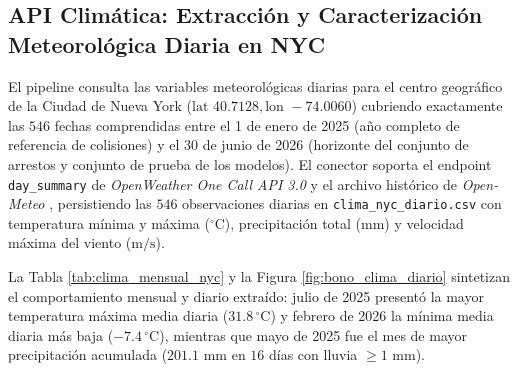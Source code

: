 \subsection{API Climática: Extracción y Caracterización Meteorológica Diaria en NYC}
\label{subsec:bono_api_clima}

El pipeline consulta las variables meteorológicas diarias para el centro geográfico de la Ciudad de Nueva York ($\text{lat } 40.7128, \text{lon } -74.0060$) cubriendo exactamente las $546$ fechas comprendidas entre el 1 de enero de 2025 (año completo de referencia de colisiones) y el 30 de junio de 2026 (horizonte del conjunto de arrestos y conjunto de prueba de los modelos). El conector soporta el endpoint \texttt{day\_summary} de \textit{OpenWeather One Call API 3.0} \cite{openweather_onecall_2026} y el archivo histórico de \textit{Open-Meteo} \cite{openmeteo_historical_2026}, persistiendo las $546$ observaciones diarias en \texttt{clima\_nyc\_diario.csv} con temperatura mínima y máxima ($^\circ\text{C}$), precipitación total ($\text{mm}$) y velocidad máxima del viento ($\text{m/s}$).

La Tabla \ref{tab:clima_mensual_nyc} y la Figura \ref{fig:bono_clima_diario} sintetizan el comportamiento mensual y diario extraído: julio de 2025 presentó la mayor temperatura máxima media diaria ($31.8\,^\circ\text{C}$) y febrero de 2026 la mínima media diaria más baja ($-7.4\,^\circ\text{C}$), mientras que mayo de 2025 fue el mes de mayor precipitación acumulada ($201.1\text{ mm}$ en $16$ días con lluvia $\ge 1\text{ mm}$).


